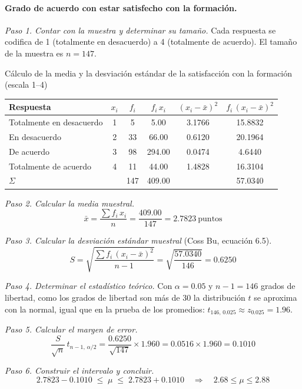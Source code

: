 \paragraph{Grado de acuerdo con estar satisfecho con la formación.}

\textit{Paso 1. Contar con la muestra y determinar su tamaño.} Cada respuesta se codifica de 1 (totalmente en desacuerdo) a 4 (totalmente de acuerdo). El tamaño de la muestra es $n = 147$.

\begin{mitabla}{Cálculo de la media y la desviación estándar de la satisfacción con la formación (escala 1--4)}
\begin{tabular}{lccccc}
\toprule
Respuesta & $x_i$ & $f_i$ & $f_i\,x_i$ & $(x_i-\bar{x})^2$ & $f_i\,(x_i-\bar{x})^2$ \\
\midrule
Totalmente en desacuerdo & 1 & 5 & 5.00 & 3.1766 & 15.8832 \\
En desacuerdo & 2 & 33 & 66.00 & 0.6120 & 20.1964 \\
De acuerdo & 3 & 98 & 294.00 & 0.0474 & 4.6440 \\
Totalmente de acuerdo & 4 & 11 & 44.00 & 1.4828 & 16.3104 \\
\midrule
$\Sigma$ & & 147 & 409.00 & & 57.0340 \\
\bottomrule
\end{tabular}
\end{mitabla}

\textit{Paso 2. Calcular la media muestral.}
\[
\bar{x} = \frac{\sum f_i\,x_i}{n} = \frac{409.00}{147} = 2.7823\ \text{puntos}
\]

\textit{Paso 3. Calcular la desviación estándar muestral} (Coss Bu, ecuación 6.5).
\[
S = \sqrt{\frac{\sum f_i\,(x_i-\bar{x})^2}{n-1}} = \sqrt{\frac{57.0340}{146}} = 0.6250
\]

\textit{Paso 4. Determinar el estadístico teórico.} Con $\alpha = 0.05$ y $n-1 = 146$ grados de libertad, como los grados de libertad son más de 30 la distribución $t$ se aproxima con la normal, igual que en la prueba de los promedios: $t_{146,\,0.025} \approx z_{0.025} = 1.96$.

\textit{Paso 5. Calcular el margen de error.}
\[
\frac{S}{\sqrt{n}}\,t_{n-1,\,\alpha/2} = \frac{0.6250}{\sqrt{147}}\times 1.960 = 0.0516 \times 1.960 = 0.1010
\]

\textit{Paso 6. Construir el intervalo y concluir.}
\[
2.7823 - 0.1010 \;\le\; \mu \;\le\; 2.7823 + 0.1010 \quad\Longrightarrow\quad 2.68 \le \mu \le 2.88
\]


